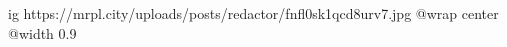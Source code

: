  
 
 
 
 

\ifcmt
  ig https://mrpl.city/uploads/posts/redactor/fnfl0sk1qcd8urv7.jpg
  @wrap center
  @width 0.9
\fi
